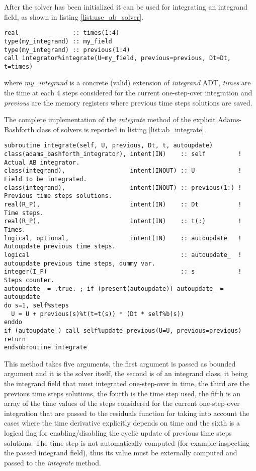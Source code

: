 \documentclass[pdftex,preprint,3p,times,numbers]{elsarticle}
\begin{document}
After the solver has been initialized it can be used for integrating an integrand field, as shown in listing \ref{list:use_ab_solver}.

\begin{lstlisting}[firstnumber=1,style=code,caption={example of usage of an Adams-Bashforth integrator},label={list:use_ab_solver}]
real               :: times(1:4)
type(my_integrand) :: my_field
type(my_integrand) :: previous(1:4)
call integrator%integrate(U=my_field, previous=previous, Dt=Dt, t=times)
\end{lstlisting}
where \emph{my\_integrand} is a concrete (valid) extension of \emph{integrand} ADT, \emph{times} are the time at each 4 steps considered for the current one-step-over integration and \emph{previous} are the memory registers where previous time steps solutions are saved.

The complete implementation of the \emph{integrate} method of the explicit Adams-Bashforth class of solvers is reported in listing \ref{list:ab_integrate}.

\begin{lstlisting}[firstnumber=1,style=code,caption={implementation of the \emph{integrate} method of explicit Adams-Bashforth class},label={list:ab_integrate}]
subroutine integrate(self, U, previous, Dt, t, autoupdate)
class(adams_bashforth_integrator), intent(IN)    :: self         ! Actual AB integrator.
class(integrand),                  intent(INOUT) :: U            ! Field to be integrated.
class(integrand),                  intent(INOUT) :: previous(1:) ! Previous time steps solutions.
real(R_P),                         intent(IN)    :: Dt           ! Time steps.
real(R_P),                         intent(IN)    :: t(:)         ! Times.
logical, optional,                 intent(IN)    :: autoupdate   ! Autoupdate previous time steps.
logical                                          :: autoupdate_  ! autoupdate previous time steps, dummy var.
integer(I_P)                                     :: s            ! Steps counter.
autoupdate_ = .true. ; if (present(autoupdate)) autoupdate_ = autoupdate
do s=1, self%steps
  U = U + previous(s)%t(t=t(s)) * (Dt * self%b(s))
enddo
if (autoupdate_) call self%update_previous(U=U, previous=previous)
return
endsubroutine integrate
\end{lstlisting}

This method takes five arguments, the first argument is passed as bounded argument and it is the solver itself, the second is of an integrand class, it being the integrand field that must integrated one-step-over in time, the third are the previous time steps solutions, the fourth is the time step used, the fifth is an array of the time values of the steps considered for the current one-step-over integration that are passed to the residuals function for taking into account the cases where the time derivative explicitly depends on time and the sixth is a logical flag for enabling/disabling the cyclic update of previous time steps solutions. The time step is not automatically computed (for example inspecting the passed integrand field), thus its value must be externally computed and passed to the \emph{integrate} method.
\end{document}
